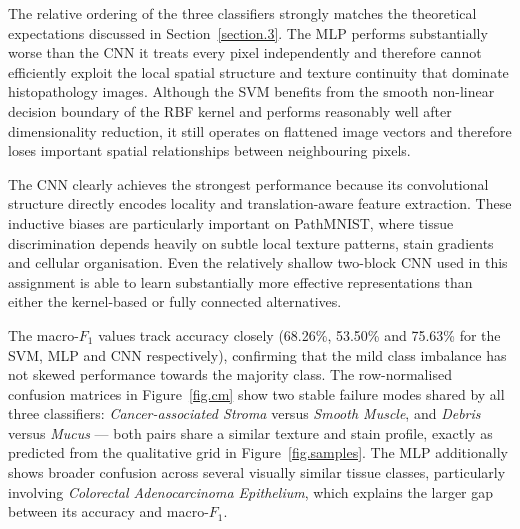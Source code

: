 \documentclass[../main.tex]{subfiles}
\begin{document}
\noindent
The relative ordering of the three classifiers strongly matches the
theoretical expectations discussed in
Section~\ref{section.3}. The \gls{MLP} performs substantially worse than the CNN it treats
every pixel independently and therefore cannot efficiently exploit the
local spatial structure and texture continuity that dominate
histopathology images. Although the \gls{SVM} benefits from the smooth
non-linear decision boundary of the \gls{RBF} kernel and performs
reasonably well after dimensionality reduction, it still operates on
flattened image vectors and therefore loses important spatial
relationships between neighbouring pixels.

\noindent
The \gls{CNN} clearly achieves the strongest performance because its
convolutional structure directly encodes locality and translation-aware
feature extraction. These inductive biases are particularly important on
PathMNIST, where tissue discrimination depends heavily on subtle local
texture patterns, stain gradients and cellular organisation. Even the
relatively shallow two-block \gls{CNN} used in this assignment is able to
learn substantially more effective representations than either the
kernel-based or fully connected alternatives.

\noindent
The macro-$F_{1}$ values track accuracy closely
(68.26\%, 53.50\% and 75.63\% for the SVM, MLP
and CNN respectively), confirming that the mild class imbalance has not
skewed performance towards the majority class. The row-normalised
confusion matrices in Figure~\ref{fig.cm} show two stable failure modes
shared by all three classifiers: \emph{Cancer-associated Stroma} versus
\emph{Smooth Muscle}, and \emph{Debris} versus \emph{Mucus} — both pairs
share a similar texture and stain profile, exactly as predicted from the
qualitative grid in Figure~\ref{fig.samples}. The MLP additionally shows broader confusion across several visually
similar tissue classes, particularly involving
\emph{Colorectal Adenocarcinoma Epithelium}, which explains the larger
gap between its accuracy and macro-$F_{1}$.
\end{document}
